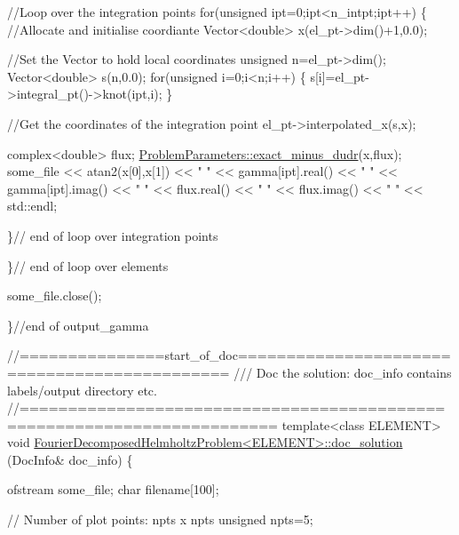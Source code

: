 \begin{DoxyCodeInclude}
{   \textcolor{comment}{//Loop over the integration points}
   \textcolor{keywordflow}{for}(\textcolor{keywordtype}{unsigned} ipt=0;ipt<n\_intpt;ipt++)
    \{
     \textcolor{comment}{//Allocate and initialise coordiante}
     Vector<double> x(el\_pt->dim()+1,0.0);
     
     \textcolor{comment}{//Set the Vector to hold local coordinates}
     \textcolor{keywordtype}{unsigned} n=el\_pt->dim();
     Vector<double> s(n,0.0);
     \textcolor{keywordflow}{for}(\textcolor{keywordtype}{unsigned} i=0;i<n;i++)
      \{
       s[i]=el\_pt->integral\_pt()->knot(ipt,i);
      \}
     
     \textcolor{comment}{//Get the coordinates of the integration point}
     el\_pt->interpolated\_x(s,x);
     
     complex<double> flux;
     \hyperlink{namespaceProblemParameters_aa544d1f3e384d3283f7113512931ea8f}{ProblemParameters::exact\_minus\_dudr}(x,flux);
     some\_file << atan2(x[0],x[1]) << \textcolor{stringliteral}{" "} 
               << gamma[ipt].real() << \textcolor{stringliteral}{" "}
               << gamma[ipt].imag() << \textcolor{stringliteral}{" "}
               << flux.real() << \textcolor{stringliteral}{" "} 
               << flux.imag() << \textcolor{stringliteral}{" "} 
               << std::endl;
     
    \}\textcolor{comment}{// end of loop over integration points}
   
  \}\textcolor{comment}{// end of loop over elements}
 
 some\_file.close();
  
\}\textcolor{comment}{//end of output\_gamma}


\textcolor{comment}{//===============start\_of\_doc=============================================}\textcolor{comment}{}
\textcolor{comment}{/// Doc the solution: doc\_info contains labels/output directory etc.}
\textcolor{comment}{}\textcolor{comment}{//========================================================================}
\textcolor{keyword}{template}<\textcolor{keyword}{class} ELEMENT>
\textcolor{keywordtype}{void} \hyperlink{classFourierDecomposedHelmholtzProblem_a893efb01f8f1d254315201121766d882}{FourierDecomposedHelmholtzProblem<ELEMENT>::doc\_solution}
      (DocInfo& doc\_info)
\{ 

 ofstream some\_file;
 \textcolor{keywordtype}{char} filename[100];

 \textcolor{comment}{// Number of plot points: npts x npts}
 \textcolor{keywordtype}{unsigned} npts=5;
  
}
\end{DoxyCodeInclude}
